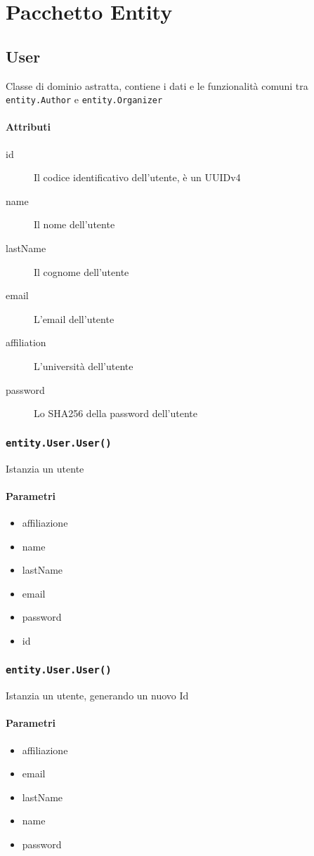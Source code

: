 \section{Pacchetto Entity}
\label{sec:impl_entity}
\subsection{User}
Classe di dominio astratta, contiene i dati e le funzionalità comuni
tra \texttt{entity.Author} e \texttt{entity.Organizer}
\paragraph{Attributi}
\begin{description}
\item[id] Il codice identificativo dell'utente, è un UUIDv4
\item[name] Il nome dell'utente
\item[lastName] Il cognome dell'utente
\item[email] L'email dell'utente
\item[affiliation] L'università dell'utente
\item[password] Lo SHA256 della password dell'utente
\end{description}

\subsubsection{\texttt{entity.User.User()}}
Istanzia un utente
\paragraph{Parametri}
\begin{itemize}
\item affiliazione
\item name
\item lastName
\item email
\item password
\item id
\end{itemize}

\subsubsection{\texttt{entity.User.User()}}
Istanzia un utente, generando un nuovo Id
\paragraph{Parametri}
\begin{itemize}
  \item affiliazione
  \item email
\item lastName
\item name
\item password
\end{itemize}

